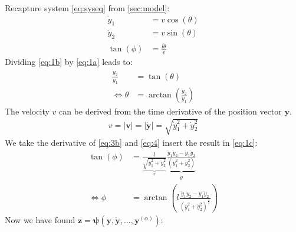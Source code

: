 \documentclass[a4paper,11pt,headings=standardclasses]{scrartcl}%
\newcommand{\y}{\mathbf{y}}
\newcommand{\z}{\mathbf{z}}
\begin{document}
Recapture system \eqref{eq:syseq} from \autoref{sec:model}:
\setcounter{equation}{0}
\begin{subequations}
\label{eq:1}
\begin{align}
\dot{y}_1&=v \cos (\theta) \label{eq:1a}\\
\dot{y}_2&=v \sin (\theta) \label{eq:1b}\\
\tan(\phi) &= \frac{l\dot{\theta}}{v} \label{eq:1c}
\end{align}
\end{subequations}
\setcounter{equation}{2}
Dividing \eqref{eq:1b} by \eqref{eq:1a} leads to:
\begin{subequations}
\begin{align}
\frac{\dot{y}_2}{\dot{y}_1} &=\tan(\theta) \label{eq:3a}\\
\Leftrightarrow  \theta &= \arctan\left(\frac{\dot{y}_2}{\dot{y}_1}\right) \label{eq:3b}
\end{align}
\end{subequations}
The velocity $v$ can be derived from the time derivative of the position vector $\y$.
\begin{align}
\label{eq:4}
v =\left| \mathbf{v} \right| = \left| \dot{\y} \right| = \sqrt{\dot{y}_1^2+\dot{y}_2^2}
\end{align}
We take the derivative of \eqref{eq:3b} and \eqref{eq:4} insert the result in \eqref{eq:1c}:
\begin{subequations}
\begin{align}
\tan(\phi) &= \frac{l}{\underbrace{\sqrt{\dot{y}_1^2+\dot{y}_2^2}}_{v}} \underbrace{\frac{\ddot{y}_1 \dot{y}_2 - \dot{y}_1 \ddot{y}_2}{(\dot{y}_1^2+\dot{y}_2^2)}}_{\dot{\theta}}\label{eq:5a} \\
\Leftrightarrow \phi &= \arctan\left(l \frac{\ddot{y}_1 \dot{y}_2 - \dot{y}_1 \ddot{y}_2}{(\dot{y}_1^2+\dot{y}_2^2)^{\frac{3}{2}}} 
\right) \label{eq:5b}
\end{align}
\end{subequations}
Now we have found $\z = \mathbf{\psi}(\y,\dot{\y},...,\y^{(\alpha)})$:
\end{document}
